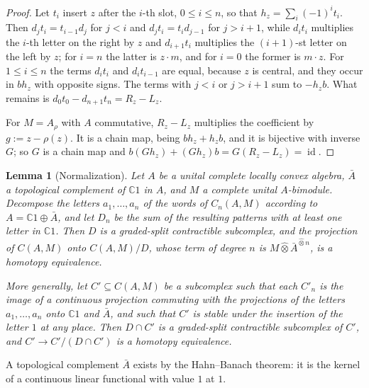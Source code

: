 \documentclass[11pt]{amsart}
\newtheorem{lemma}[theorem]{Lemma}
\theoremstyle{definition}
\theoremstyle{remark}
\newcommand{\C}{\mathbb C}
\newcommand{\id}{\operatorname{id}}
\begin{document}
\begin{proof}
Let $t_i$ insert $z$ after the $i$-th slot, $0\le i\le n$, so that
$h_z=\sum_i(-1)^{i}t_i$.  Then $d_jt_i=t_{i-1}d_j$ for $j<i$ and
$d_jt_i=t_id_{j-1}$ for $j>i+1$, while $d_it_i$ multiplies the $i$-th letter
on the right by $z$ and $d_{i+1}t_i$ multiplies the $(i+1)$-st letter on the
left by $z$; for $i=n$ the latter is $z\cdot m$, and for $i=0$ the former is
$m\cdot z$.  For $1\le i\le n$ the terms $d_it_i$ and $d_it_{i-1}$ are equal,
because $z$ is central, and they occur in $bh_z$ with opposite signs.  The
terms with $j<i$ or $j>i+1$ sum to $-h_zb$.  What remains is
$d_0t_0-d_{n+1}t_n=R_z-L_z$.

For $M=A_{\rho}$ with $A$ commutative, $R_z-L_z$ multiplies the coefficient by
$g:=z-\rho(z)$.  It is a chain map, being $bh_z+h_zb$, and it is bijective with
inverse $G$; so $G$ is a chain map and $b(Gh_z)+(Gh_z)b=G(R_z-L_z)=\id$.
\end{proof}

\begin{lemma}[Normalization]\label{lem:normal}
Let $A$ be a unital complete locally convex algebra, $\bar A$ a topological
complement of $\C1$ in $A$, and $M$ a complete unital $A$-bimodule.  Decompose
the letters $a_1,\dots,a_n$ of the words of $C_n(A,M)$ according to
$A=\C1\oplus\bar A$, and let $D_n$ be the sum of the resulting patterns with at
least one letter in $\C1$.  Then $D$ is a graded-split contractible subcomplex,
and the projection of $C(A,M)$ onto $C(A,M)/D$, whose term of degree $n$ is
$M\widehat\otimes\bar A^{\widehat\otimes n}$, is a homotopy equivalence.

More generally, let $C'\subseteq C(A,M)$ be a subcomplex such that each $C'_n$
is the image of a continuous projection commuting with the projections of the
letters $a_1,\dots,a_n$ onto $\C1$ and $\bar A$, and such that $C'$ is stable
under the insertion of the letter $1$ at any place.  Then $D\cap C'$ is a
graded-split contractible subcomplex of $C'$, and $C'\to C'/(D\cap C')$ is a
homotopy equivalence.
\end{lemma}

A topological complement $\bar A$ exists by the Hahn--Banach theorem: it is the
kernel of a continuous linear functional with value $1$ at $1$.
\end{document}
